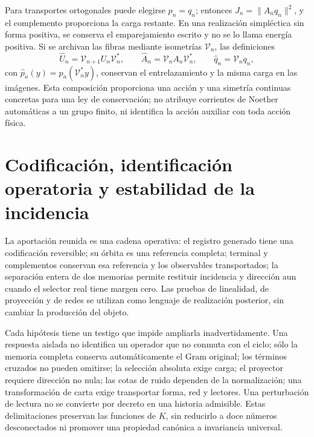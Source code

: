Para transportes ortogonales puede elegirse \(p_n=q_n\); entonces
\(J_n=\|A_nq_n\|^2\), y el complemento proporciona la carga
restante. En una realización simpléctica sin forma positiva, se conserva
el emparejamiento escrito y no se lo llama energía positiva. Si se
archivan las fibras mediante isometrías \(\mathcal V_n\), las
definiciones
\[
 \widehat U_n=\mathcal V_{n+1}U_n\mathcal V_n^*,\qquad
 \widehat A_n=\mathcal V_nA_n\mathcal V_n^*,\qquad
 \widehat q_n=\mathcal V_nq_n,
\]
con \(\widehat p_n(y)=p_n(\mathcal V_n^*y)\), conservan el
entrelazamiento y la misma carga en las imágenes. Esta composición
proporciona una acción y una simetría continuas concretas para una ley de
conservación; no atribuye corrientes de Noether automáticas a un grupo
finito, ni identifica la acción auxiliar con toda acción física.

\section{Codificación, identificación operatoria y estabilidad de la incidencia}
\label{x_reciprocidad:lib01:alcance}

La aportación reunida es una cadena operativa: el registro generado tiene
una codificación reversible; su órbita es una referencia completa;
terminal y complementos conservan esa referencia y los observables
transportados; la separación entera de dos memorias permite restituir
incidencia y dirección aun cuando el selector real tiene margen cero.
Las pruebas de linealidad, de proyección y de redes se utilizan como
lenguaje de realización posterior, sin cambiar la producción del objeto.

Cada hipótesis tiene un testigo que impide ampliarla inadvertidamente.
Una respuesta aislada no identifica un operador que no conmuta con el
ciclo; sólo la memoria completa conserva automáticamente el Gram original;
los términos cruzados no pueden omitirse; la selección absoluta exige
carga; el proyector requiere dirección no nula; las cotas de ruido
dependen de la normalización; una transformación de carta exige transportar
forma, red y lectores. Una perturbación de lectura no se convierte por
decreto en una historia admisible. Estas delimitaciones preservan las
funciones de \(K\), sin reducirlo a doce números desconectados ni
promover una propiedad canónica a invariancia universal.
